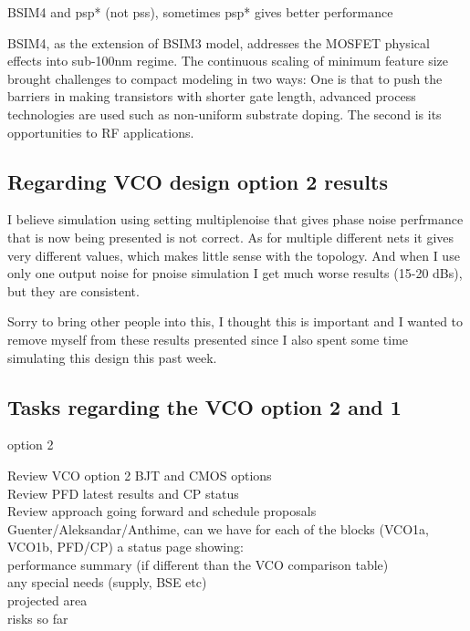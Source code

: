 \documentclass{article}
\begin{document}
BSIM4 and psp* (not pss), sometimes psp* gives better performance

BSIM4, as the extension of BSIM3 model, addresses the MOSFET physical effects into sub-100nm regime. The continuous scaling of minimum feature size brought challenges to compact modeling in two ways: One is that to push the barriers in making transistors with shorter gate length, advanced process technologies are used such as non-uniform substrate doping. The second is its opportunities to RF applications.


\subsection{Regarding VCO design option 2 results}


I believe simulation using setting multiplenoise that gives phase noise perfrmance that is now being presented is not correct.
As for multiple different nets it gives very different values, which makes little sense with the topology.
And when I use only one output noise for pnoise simulation I get much worse results (15-20 dBs), but they are consistent.

Sorry to bring other people into this, I thought this is important and I wanted to remove myself from these results presented since I also spent some time simulating this design this past week.





\subsection{Tasks regarding the VCO option 2 and 1}

option 2

Review VCO option 2 BJT and CMOS options \\
Review PFD latest results and CP status \\
Review approach going forward and schedule proposals \\

Guenter/Aleksandar/Anthime, can we have for each of the blocks (VCO1a, VCO1b, PFD/CP) a status page showing: \\
performance summary (if different than the VCO comparison table) \\
any special needs (supply, BSE etc) \\
projected area \\
risks so far
\end{document}
